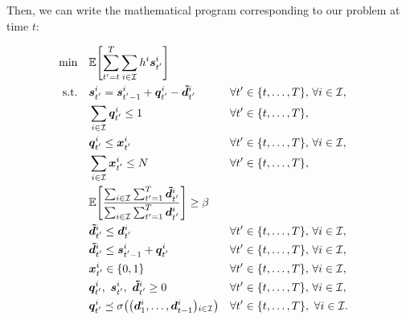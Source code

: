 Then, we can write the mathematical program corresponding to our problem at time $t$:


\begin{subequations}\label{eq:Uniform-CLSP-BS:service-level}
  \begin{align}
    \min\quad & \rlap{$\ds \espe\sqbracket{\sum_{t'=t}^{\horizon} \sum_{i\in\REF} \holding^i\va\inventory_{t'}^i}$}
    \label{eq:Uniform-CLSP-BS:service-level:objective}
    \\
    \st\quad & \ds \va\inventory_{t'}^i = \va\inventory_{t'-1}^i + \va\quantity_{t'}^i - \va\supplied_{t'}^i && \forall t'\in\range[t]{\horizon},\, \forall i\in\REF,
    \label{eq:Uniform-CLSP-BS:service-level:inventory-dynamic}
    \\
    & \ds \sum_{i\in\REF} \va\quantity_{t'}^i \le 1 && \forall t'\in\range[t]{\horizon},
    \label{eq:Uniform-CLSP-BS:service-level:capacity}
    \\
    & \ds \va\quantity_{t'}^i \le \va\setup_{t'}^i && \forall t'\in\range[t]{\horizon},\, \forall i\in\REF,
    \label{eq:Uniform-CLSP-BS:service-level:big-M}
    \\
    & \ds \sum_{i\in\REF} \va\setup_{t'}^i \le \nbsetups && \forall t'\in\range[t]{\horizon},
    \label{eq:Uniform-CLSP-BS:service-level:setups}
    \\
    & \ds \espe\sqbracket{\frac{\sum_{i\in\REF}\sum_{t'=1}^{\horizon}\va\supplied_{t'}^i }{\sum_{i\in\REF}\sum_{t'=1}^{\horizon}\va\demand_{t'}^i}} \ge \servicelvl
    \label{eq:Uniform-CLSP-BS:service-level:service-level}
    \\
    & \ds \va\supplied_{t'}^i \le \va\demand_{t'}^i && \forall t'\in\range[t]{\horizon},\, \forall i\in\REF,
    \label{eq:Uniform-CLSP-BS:service-level:supplied-bound-demand}
    \\
    & \ds \va\supplied_{t'}^i \le \va\inventory_{t'-1}^i+\va\quantity_{t'}^i && \forall t'\in\range[t]{\horizon},\, \forall i\in\REF,
    \label{eq:Uniform-CLSP-BS:service-level:supplied-bound-production}
    \\
    & \ds \va\setup_{t'}^i \in \crbracket{0,1} && \forall t'\in\range[t]{\horizon},\, \forall i\in\REF,
    \label{eq:Uniform-CLSP-BS:service-level:binary}
    \\
    & \ds \va\quantity_{t'}^i,\ \va\inventory_{t'}^i,\ \va\supplied_{t'}^i \ge 0 && \forall t'\in\range[t]{\horizon},\, \forall i\in\REF,
    \label{eq:Uniform-CLSP-BS:service-level:positity}
    \\
    & \ds \va\quantity_{t'}^i \preceq \Sfield{\bracket{\va\demand_1^i,\ldots,\va\demand_{t-1}^i}_{i\in\REF}} && \forall t'\in\range[t]{\horizon},\ \forall i\in\REF.
    \label{eq:Uniform-CLSP-BS:service-level:measurability}
  \end{align}
\end{subequations}

